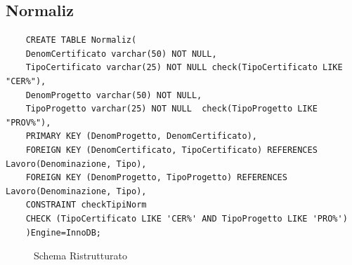 \documentclass{elegantbook}
\begin{document}
\subsection{Normaliz}
\begin{verbatim}
	CREATE TABLE Normaliz(
	DenomCertificato varchar(50) NOT NULL,
	TipoCertificato varchar(25) NOT NULL check(TipoCertificato LIKE "CER%"),
	DenomProgetto varchar(50) NOT NULL,
	TipoProgetto varchar(25) NOT NULL  check(TipoProgetto LIKE "PROV%"),
	PRIMARY KEY (DenomProgetto, DenomCertificato),
	FOREIGN KEY (DenomCertificato, TipoCertificato) REFERENCES Lavoro(Denominazione, Tipo),
	FOREIGN KEY (DenomProgetto, TipoProgetto) REFERENCES Lavoro(Denominazione, Tipo),
	CONSTRAINT checkTipiNorm 
	CHECK (TipoCertificato LIKE 'CER%' AND TipoProgetto LIKE 'PRO%')
	)Engine=InnoDB;
\end{verbatim}
\begin{figure}[H]
	\centering
	\caption{Schema Ristrutturato}
\end{figure}
\end{document}
